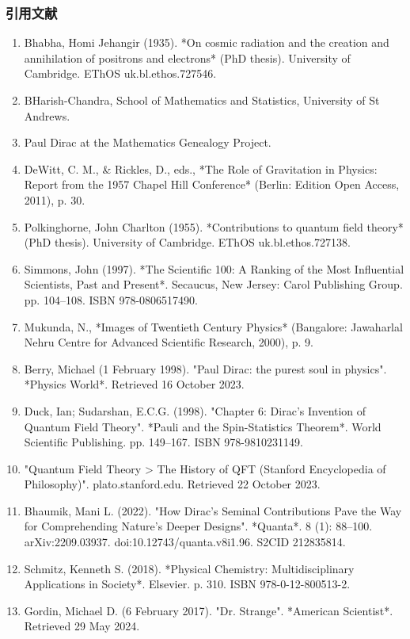\subsubsection{引用文献}
\begin{enumerate}
\item Bhabha, Homi Jehangir (1935). *On cosmic radiation and the creation and annihilation of positrons and electrons* (PhD thesis). University of Cambridge. EThOS uk.bl.ethos.727546.
\item BHarish-Chandra, School of Mathematics and Statistics, University of St Andrews.
\item Paul Dirac at the Mathematics Genealogy Project.
\item DeWitt, C. M., & Rickles, D., eds., *The Role of Gravitation in Physics: Report from the 1957 Chapel Hill Conference* (Berlin: Edition Open Access, 2011), p. 30.
\item Polkinghorne, John Charlton (1955). *Contributions to quantum field theory* (PhD thesis). University of Cambridge. EThOS uk.bl.ethos.727138.
\item Simmons, John (1997). *The Scientific 100: A Ranking of the Most Influential Scientists, Past and Present*. Secaucus, New Jersey: Carol Publishing Group. pp. 104–108. ISBN 978-0806517490.
\item Mukunda, N., *Images of Twentieth Century Physics* (Bangalore: Jawaharlal Nehru Centre for Advanced Scientific Research, 2000), p. 9.
\item Berry, Michael (1 February 1998). "Paul Dirac: the purest soul in physics". *Physics World*. Retrieved 16 October 2023.
\item Duck, Ian; Sudarshan, E.C.G. (1998). "Chapter 6: Dirac's Invention of Quantum Field Theory". *Pauli and the Spin-Statistics Theorem*. World Scientific Publishing. pp. 149–167. ISBN 978-9810231149.
\item "Quantum Field Theory > The History of QFT (Stanford Encyclopedia of Philosophy)". plato.stanford.edu. Retrieved 22 October 2023.
\item Bhaumik, Mani L. (2022). "How Dirac's Seminal Contributions Pave the Way for Comprehending Nature's Deeper Designs". *Quanta*. 8 (1): 88–100. arXiv:2209.03937. doi:10.12743/quanta.v8i1.96. S2CID 212835814.
\item Schmitz, Kenneth S. (2018). *Physical Chemistry: Multidisciplinary Applications in Society*. Elsevier. p. 310. ISBN 978-0-12-800513-2.
\item Gordin, Michael D. (6 February 2017). "Dr. Strange". *American Scientist*. Retrieved 29 May 2024.

\end{enumerate}

